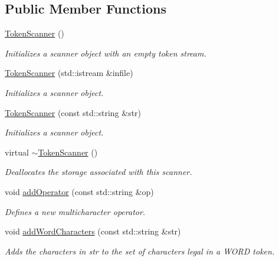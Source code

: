 \subsection*{Public Member Functions}
\begin{DoxyCompactItemize}
\item 
\mbox{\hyperlink{classTokenScanner_a284595cf3c3df7d3e70ef2dcdc1f0292}{Token\+Scanner}} ()
\begin{DoxyCompactList}\small\item\em Initializes a scanner object with an empty token stream. \end{DoxyCompactList}\item 
\mbox{\hyperlink{classTokenScanner_aa82b5fa6beae663f87eaa0ae964a48b3}{Token\+Scanner}} (std\+::istream \&infile)
\begin{DoxyCompactList}\small\item\em Initializes a scanner object. \end{DoxyCompactList}\item 
\mbox{\hyperlink{classTokenScanner_a55859460fe8f07596fbc93d91314254a}{Token\+Scanner}} (const std\+::string \&str)
\begin{DoxyCompactList}\small\item\em Initializes a scanner object. \end{DoxyCompactList}\item 
virtual \mbox{\hyperlink{classTokenScanner_a38bfeb2d700fbb486f5b3a4283419ae5}{$\sim$\+Token\+Scanner}} ()
\begin{DoxyCompactList}\small\item\em Deallocates the storage associated with this scanner. \end{DoxyCompactList}\item 
void \mbox{\hyperlink{classTokenScanner_a5256bb7e66b4509946204727182994f9}{add\+Operator}} (const std\+::string \&op)
\begin{DoxyCompactList}\small\item\em Defines a new multicharacter operator. \end{DoxyCompactList}\item 
void \mbox{\hyperlink{classTokenScanner_aed3e8321a04deee5d8bebce0d6d715ac}{add\+Word\+Characters}} (const std\+::string \&str)
\begin{DoxyCompactList}\small\item\em Adds the characters in {\ttfamily str} to the set of characters legal in a {\ttfamily W\+O\+RD} token. \end{DoxyCompactList}\item 

\end{DoxyCompactItemize}
